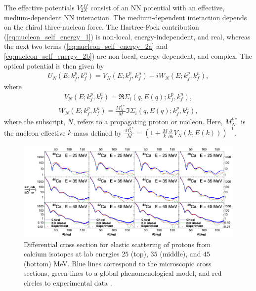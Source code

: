 \documentclass[preprintnumbers,floatfix,aps,prc,preprint,nofootinbib]{revtex4-1}
\begin{document}
The effective potentials $V_{2N}^{eff}$ consist of an NN potential with an effective, medium-dependent NN interaction. The medium-dependent interaction depends on the chiral three-nucleon force. The Hartree-Fock contribution (\ref{eq:nucleon_self_energy_1}) is non-local, energy-independent, and real, whereas the next two terms (\ref{eq:nucleon_self_energy_2a} and \ref{eq:nucleon_self_energy_2b}) are non-local, energy dependent, and complex. The optical potential is  then given by
%
\begin{eqnarray}
	\label{eq:nucleon_self_energy_optical_potential}
	U_N(E; k_f^p, k_f^n) = V_N(E; k_f^p, k_f^n) + i W_N(E; k_f^p, k_f^n),
\end{eqnarray}
%
where
\begin{eqnarray}
	\label{eq:nucleon_self_energy_optical_potential_real}
	V_N(E; k_f^p, k_f^n) = \Re \Sigma_i (q, E(q); k_f^p, k_f^n),
\end{eqnarray}
%
\begin{eqnarray}
	\label{eq:nucleon_self_energy_optical_potential_imaginary}
	W_N(E; k_f^p, k_f^n) = \frac{M_N^{k*}}{M} \Im \Sigma_i (q, E(q); k_f^p, k_f^n),
\end{eqnarray}
%
where the subscript, $N$, refers to a propagating proton or nucleon. Here, $M_N^{k*}$ is the nucleon effective $k$-mass defined by $\frac{M_N^{k*}}{M} = (1+\frac{M}{k} \frac{\partial}{\partial k} V_N(k, E(k)))^{-1}$.
\\

%
\begin{figure}
	\captionsetup{singlelinecheck=false,justification=raggedright}
	\centering
	\includegraphics[width=15cm]{whitehead_figure}
	\caption{Differential cross section for elastic scattering of protons from calcium isotopes at lab energies $25$ (top), $35$ (middle), and $45$ (bottom) MeV. Blue lines correspond to the microscopic cross sections, green lines to a global phenomenological model, and red circles to experimental data \cite{Whitehead:2018bfs}.}
	\label{fig:whitehead_figure}
\end{figure}
%
\end{document}

